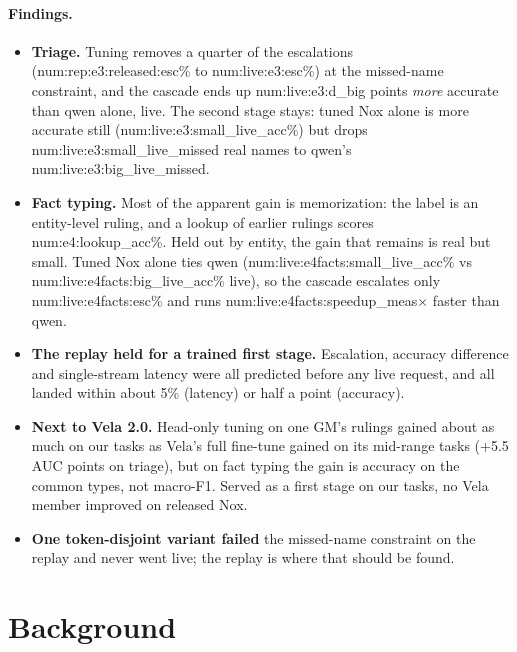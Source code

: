 \documentclass[11pt]{article}
\newcommand{\N}[1]{\csname num:#1\endcsname}
\begin{document}
\paragraph{Findings.}
\begin{itemize}
  \item \textbf{Triage.} Tuning removes a quarter of the escalations (\N{rep:e3:released:esc}\% to
        \N{live:e3:esc}\%) at the missed-name constraint, and the cascade ends up
        \N{live:e3:d_big} points \emph{more} accurate than qwen alone, live. The second stage stays:
        tuned Nox alone is more accurate still (\N{live:e3:small_live_acc}\%) but drops
        \N{live:e3:small_live_missed} real names to qwen's \N{live:e3:big_live_missed}.
  \item \textbf{Fact typing.} Most of the apparent gain is memorization: the label is an
        entity-level ruling, and a lookup of earlier rulings scores \N{e4:lookup_acc}\%. Held out by
        entity, the gain that remains is real but small. Tuned Nox alone ties qwen
        (\N{live:e4facts:small_live_acc}\% vs \N{live:e4facts:big_live_acc}\% live), so the cascade
        escalates only \N{live:e4facts:esc}\% and runs \N{live:e4facts:speedup_meas}$\times$ faster
        than qwen.
  \item \textbf{The replay held for a trained first stage.} Escalation, accuracy difference and
        single-stream latency were all predicted before any live request, and all landed within
        about 5\% (latency) or half a point (accuracy).
  \item \textbf{Next to Vela 2.0.} Head-only tuning on one GM's rulings gained about as much on our
        tasks as Vela's full fine-tune gained on its mid-range tasks (+5.5 AUC points on triage), but
        on fact typing the gain is accuracy on the common types, not macro-F1. Served as a first
        stage on our tasks, no Vela member improved on released Nox.
  \item \textbf{One token-disjoint variant failed} the missed-name constraint on the replay and
        never went live; the replay is where that should be found.
\end{itemize}

\section{Background}
\end{document}
